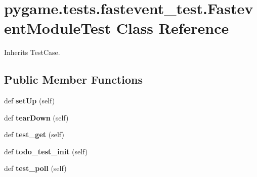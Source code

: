 \hypertarget{classpygame_1_1tests_1_1fastevent__test_1_1_fastevent_module_test}{}\section{pygame.\+tests.\+fastevent\+\_\+test.\+Fastevent\+Module\+Test Class Reference}
\label{classpygame_1_1tests_1_1fastevent__test_1_1_fastevent_module_test}


Inherits Test\+Case.

\subsection*{Public Member Functions}
\begin{DoxyCompactItemize}
\item 
\mbox{\label{classpygame_1_1tests_1_1fastevent__test_1_1_fastevent_module_test_afb356678ccb3174e91b610b47dabd880}} 
def {\bfseries set\+Up} (self)
\item 
\mbox{\label{classpygame_1_1tests_1_1fastevent__test_1_1_fastevent_module_test_a74382a9567580813acb0cc42f8da07d9}} 
def {\bfseries tear\+Down} (self)
\item 
\mbox{\label{classpygame_1_1tests_1_1fastevent__test_1_1_fastevent_module_test_a3839d662e808d423624ed5ab72425668}} 
def {\bfseries test\+\_\+get} (self)
\item 
\mbox{\label{classpygame_1_1tests_1_1fastevent__test_1_1_fastevent_module_test_ac3fddf9cbde476bc07c686f19ad9999d}} 
def {\bfseries todo\+\_\+test\+\_\+init} (self)
\item 
\mbox{\label{classpygame_1_1tests_1_1fastevent__test_1_1_fastevent_module_test_a1cf870bbdff0b8ac70deee9bb064bf5f}} 
def {\bfseries test\+\_\+poll} (self)
\item 
\mbox{\label{classpygame_1_1tests_1_1fastevent__test_1_1_fastevent_module_test_a52b576540b7137dbea6057a4f7a972d1}} 

\end{DoxyCompactItemize}
